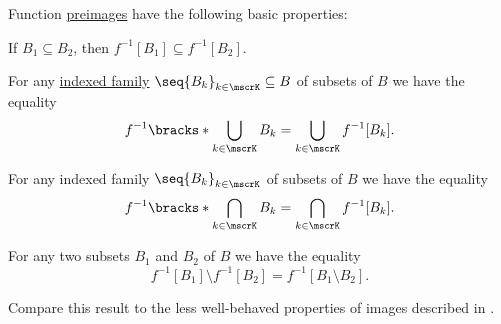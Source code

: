\begin{proposition}\label{thm:def:function_preimage}
  Function \hyperref[thm:def:function/preimage]{preimages} have the following basic properties:
  \begin{thmenum}
     If \( B_1 \subseteq B_2 \), then \( f^{-1}[B_1] \subseteq f^{-1}[B_2] \).

     For any \hyperref[def:cartesian_product/indexed_family]{indexed family} \( \seq{ B_k }_{k \in \mscrK} \subseteq B \) of subsets of \( B \) we have the equality
    \begin{equation}\label{eq:thm:def:function_preimage/union}
      f^{-1}\bracks*{ \bigcup_{k \in \mscrK} B_k } = \bigcup_{k \in \mscrK} f^{-1}[B_k].
    \end{equation}

     For any indexed family \( \seq{ B_k }_{k \in \mscrK} \) of subsets of \( B \) we have the equality
    \begin{equation}\label{eq:thm:def:function_preimage/intersection}
      f^{-1}\bracks*{ \bigcap_{k \in \mscrK} B_k } = \bigcap_{k \in \mscrK} f^{-1}[B_k].
    \end{equation}

     For any two subsets \( B_1 \) and \( B_2 \) of \( B \) we have the equality
    \begin{equation}\label{eq:thm:def:function_preimage/difference}
      f^{-1}[B_1] \setminus f^{-1}[B_2] = f^{-1}[B_1 \setminus B_2].
    \end{equation}
  \end{thmenum}

  Compare this result to the less well-behaved properties of images described in .
\end{proposition}
